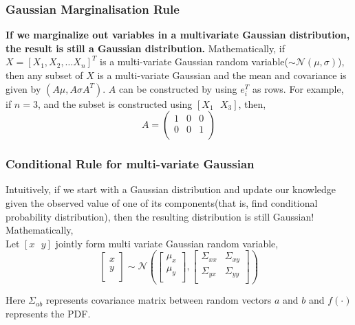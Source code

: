 \documentclass[12pt]{article}
\begin{document}
\subsubsection{Gaussian Marginalisation Rule}
\textbf{If we marginalize out variables in a multivariate Gaussian distribution, the result is still a Gaussian distribution. }Mathematically, if $X=[X_1, X_2, \dots X_n]^{T}$ is a multi-variate Gaussian random variable($\sim \mathcal{N}(\mu, \sigma)$), then any subset of $X$ is a multi-variate Gaussian and the mean and covariance is given by $(A\mu, A\sigma A^{T})$. $A$ can be constructed by using $e_{i}^{T}$ as rows. For example, if $n=3$, and the subset is constructed using $[X_{1}\text{ }X_{3}]$, then,
\[A = 
\begin{pmatrix}
    1 & 0 & 0 \\
    0 & 0 & 1 \\
\end{pmatrix}
\]

\subsubsection{Conditional Rule for multi-variate Gaussian}
Intuitively, if we start with a Gaussian distribution and update our knowledge given the observed value of one of its components(that is, find conditional probability distribution), then the resulting distribution is still Gaussian! Mathematically,\\
Let $[x \text{ }y]$ jointly form multi variate Gaussian random variable,
\[
\begin{bmatrix}
    x \\
    y \\
\end{bmatrix} \sim
\mathcal{N}
\left(
\begin{bmatrix}
    \mu_x \\
    \mu_y \\
\end{bmatrix},
\begin{bmatrix}
    \Sigma_{xx} & \Sigma_{xy}\\
    \Sigma_{yx} & \Sigma_{yy}\\
\end{bmatrix}
\right)
\]

Here $\Sigma_{ab}$ represents covariance matrix between random vectors $a$ and $b$ and $f(\cdot)$ represents the PDF.
\end{document}
